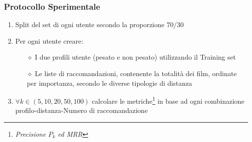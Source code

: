 \documentclass{beamer}
\begin{document}
\begin{frame}
\frametitle{Protocollo Sperimentale}
\begin{enumerate}
	\setlength{\itemsep}{10pt}
	\item<1-> Split del set di ogni utente secondo la proporzione 70/30
	\item<2-> Per ogni utente creare:
	\begin{itemize}
		\setlength{\itemsep}{6pt}
		\item[$\diamond$] I due profili utente (pesato e non pesato) utilizzando il Training set
		\item[$\diamond$] Le liste di raccomandazioni, contenente la totalità dei film, ordinate per importanza, secondo le diverse tipologie di distanza
	\end{itemize}
	\item<3-> $\forall k \in (5,10,20,50,100)$ calcolare le metriche\footnote{\emph{Precisione $P_k$ ed MRR}} in base ad ogni combinazione profilo-distanza-Numero di raccomandazione
\end{enumerate}
\end{frame}

\end{document}
